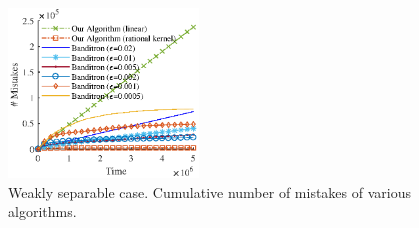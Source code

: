 \begin{figure}
\centering
\includegraphics[width=0.45\textwidth]{figures/weak3}
\caption{Weakly separable case. Cumulative number of mistakes of various algorithms.}
\label{figure:number-of-mistakes-weakly-separable-dataset}
\end{figure}
